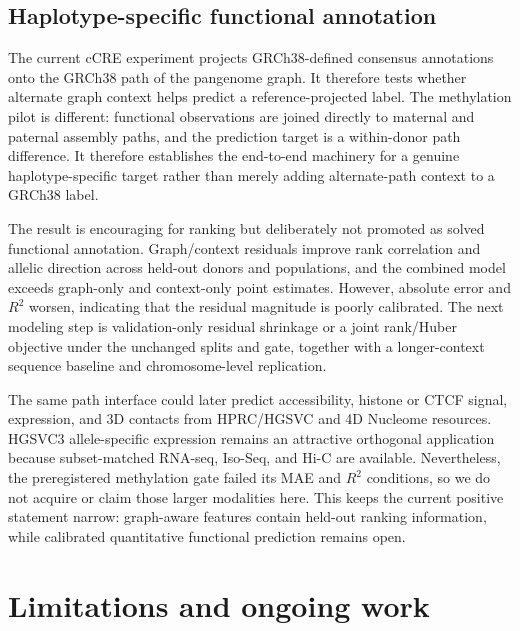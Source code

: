 \IfFileExists{ws-procs11x85.cls}{\worldscientificclasstrue\documentclass{ws-procs11x85}}{\worldscientificclassfalse\documentclass[11pt]{article}\usepackage[margin=1in]{geometry}}
\begin{document}
\subsection{Haplotype-specific functional annotation}
\label{sec:haplotype-functional}

The current cCRE experiment projects GRCh38-defined consensus annotations onto
the GRCh38 path of the pangenome graph. It therefore tests whether alternate
graph context helps predict a reference-projected label. The methylation pilot
is different: functional observations are joined directly to maternal and
paternal assembly paths, and the prediction target is a within-donor path
difference. It therefore establishes the end-to-end machinery for a genuine
haplotype-specific target rather than merely adding alternate-path context to a
GRCh38 label.

The result is encouraging for ranking but deliberately not promoted as solved
functional annotation. Graph/context residuals improve rank correlation and
allelic direction across held-out donors and populations, and the combined
model exceeds graph-only and context-only point estimates. However, absolute
error and $R^2$ worsen, indicating that the residual magnitude is poorly
calibrated. The next modeling step is validation-only residual shrinkage or a
joint rank/Huber objective under the unchanged splits and gate, together with a
longer-context sequence baseline and chromosome-level replication.

The same path interface could later predict accessibility, histone or CTCF
signal, expression, and 3D contacts from HPRC/HGSVC and 4D Nucleome
resources.\cite{encode2012,moore2020encode,dekker2017fourdn} HGSVC3
allele-specific expression remains an attractive orthogonal application because
subset-matched RNA-seq, Iso-Seq, and Hi-C are available.\cite{logsdon2025hgsvc3}
Nevertheless, the preregistered methylation gate failed its MAE and $R^2$
conditions, so we do not acquire or claim those larger modalities here. This
keeps the current positive statement narrow: graph-aware features contain
held-out ranking information, while calibrated quantitative functional
prediction remains open.

\section{Limitations and ongoing work}
\label{sec:limits}
\end{document}
